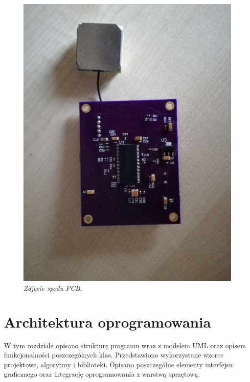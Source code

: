 \documentclass[eng,printmode]{mgr}
\begin{document}
\begin{center}\centering
\begin{figure}[!h]
\vskip 1cm
    \centering
    \includegraphics[width=\textwidth]{images/bottomPcb.jpg}
    \caption{\textit{\scriptsize Zdjęcie spodu PCB.}}
\end{figure}
\end{center}

\chapter{ Architektura oprogramowania}

W tym rozdziale opisano strukturę programu wraz z modelem UML oraz opisem funkcjonalności poszczególnych klas. Przedstawiono wykorzystane wzorce projektowe, algorytmy i biblioteki. Opisano poszczególne elementy interfejsu graficznego oraz integrację oprogramowania z warstwą sprzętową.
\end{document}
